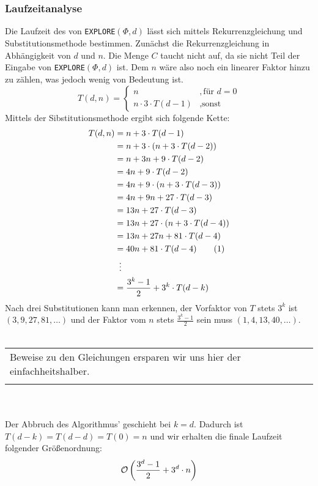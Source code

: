 \documentclass[a4paper]{article}
\newenvironment{note}
{
	\\\hfill
	\\
	\hspace*{0cm} %
	\setlength\arrayrulewidth{4pt}\arrayrulecolor{lightgray!40!gray}
	\begin{tabular}{|p{\textwidth-2cm}}
	\vspace{0.1cm}
}
{
	\\
	\vspace{0.1cm}
	\end{tabular}
	\vspace{0.1cm}
	\\\hfill
	\vspace{0.1cm}
	\\
}
\newcommand{\explore}{\texttt{EXPLORE$(\Phi, d)$}\xspace}
\begin{document}
	\maketitle
	\section{}
	\section{}
	\subsubsection{}
	
	\subsubsection*{Laufzeitanalyse}
	Die Laufzeit des von \explore lässt sich mittels Rekurrenzgleichung und Substitutionsmethode bestimmen.\n
	Zunächst die Rekurrenzgleichung in Abhängigkeit von $d$ und $n$.
	Die Menge $C$ taucht nicht auf, da sie nicht Teil der Eingabe von \explore ist. Dem $n$ wäre also noch ein linearer Faktor hinzu zu zählen, was jedoch wenig von Bedeutung ist.
	\[
		T(d, n)=
		\begin{cases}
			n					& , \text{für } d=0\\
			n\cdot 3\cdot T(d-1)		& , \text{sonst}
		\end{cases}
	\]
	Mittels der Sibstitutionsmethode ergibt sich folgende Kette:
	\begin{align*}
		T(d, n)	&=		n+3		\cdot 						T(d-1)			\\
				&=		n+3		\cdot 	(	n+3		\cdot 	T(d-2))			\\
				&=		n+3			 		n+9		\cdot 	T(d-2)			\\
				&=	4 	n+9		\cdot 						T(d-2)			\\
				&=	4 	n+9		\cdot	(	n+3		\cdot 	T(d-3))			\\
				&=	4	n+9					n+27	\cdot	T(d-3)			\\
				&=	13	n+27	\cdot						T(d-3)			\\
				&=	13	n+27	\cdot	(	n+3		\cdot	T(d-4))			\\
				&=	13	n+27				n+81	\cdot	T(d-4)			\\
				&=	40	n+81	\cdot						T(d-4)	\tag{1}	\\
				&\makebox[\widthof{${}={}$}][c]{\vdots}					\\
				&=\frac{3^k-1}{2}+3^k\cdot T(d-k)
	\end{align*}
	Nach drei Substitutionen kann man erkennen, der Vorfaktor von $T$ stets $3^k$ ist $(3, 9, 27, 81, \dots)$ und der Faktor vom $n$ stets $\frac{3^k-1}{2}$ sein muss $(1, 4, 13, 40, \dots)$.
	\begin{note}
	Beweise zu den Gleichungen ersparen wir uns hier der einfachheitshalber.
	\end{note}
	Der Abbruch des Algorithmus' geschieht bei $k=d$.
	Dadurch ist $T(d-k)=T(d-d)=T(0)=n$ und wir erhalten die finale Laufzeit folgender Größenordnung:
	\[
		\mathcal{O}\left(\frac{3^d-1}{2}+3^d\cdot n\right)
	\]
\end{document}
